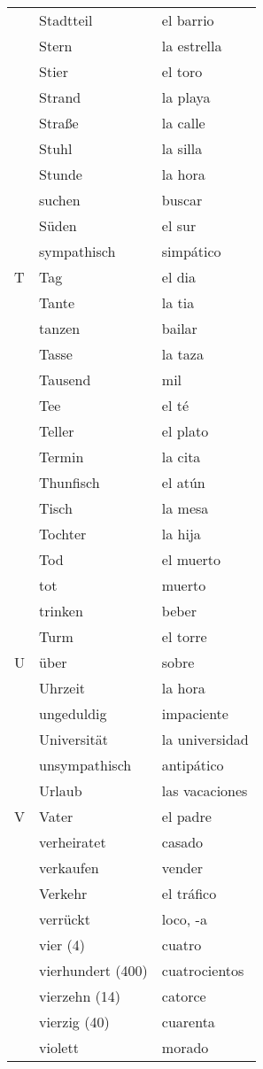 \documentclass[10pt,spanish]{article}
\begin{document}
\begin{longtable}{p{} p{} | p{}}
& Stadtteil & el barrio  \\
& Stern & la estrella \\
& Stier & el toro  \\
& Strand & la playa  \\
& Straße & la calle  \\
& Stuhl & la silla  \\
& Stunde & la hora  \\
& suchen & buscar  \\
& Süden & el sur  \\
& sympathisch & simpático \\
T & Tag & el dia  \\
& Tante & la tia  \\
& tanzen & bailar  \\
& Tasse & la taza  \\
& Tausend & mil  \\
& Tee & el té\\
& Teller & el plato  \\
& Termin & la cita  \\
& Thunfisch & el atún \\
& Tisch & la mesa  \\
& Tochter & la hija  \\
& Tod & el muerto \\
& tot & muerto \\
& trinken & beber  \\
& Turm & el torre  \\
U & über & sobre\\
& Uhrzeit & la hora  \\
& ungeduldig & impaciente \\
& Universität & la universidad \\
& unsympathisch & antipático\\
& Urlaub & las vacaciones  \\
V & Vater & el padre  \\
& verheiratet & casado  \\
& verkaufen & vender  \\
& Verkehr & el tráfico \\
& verrückt & loco, -a  \\
& vier (4) & cuatro  \\
& vierhundert (400) & cuatrocientos  \\
& vierzehn (14) & catorce  \\
& vierzig (40) & cuarenta  \\
& violett & morado  \\

\end{longtable}
\end{document}
